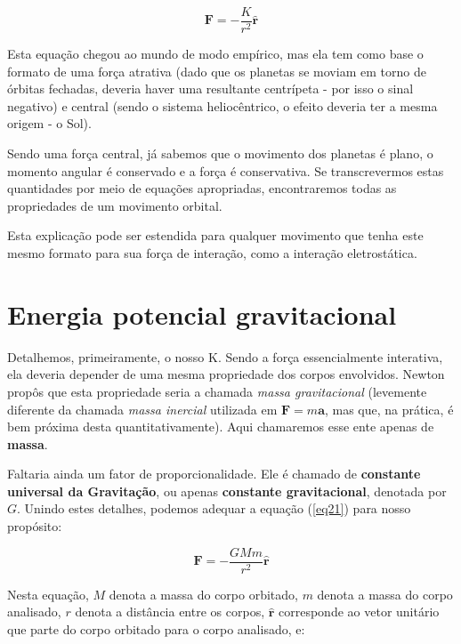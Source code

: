 \begin{equation}
    \mathbf{F} = -\frac{K}{r^2}\mathbf{\hat{r}}    \label{eq24}
\end{equation}

Esta equação chegou ao mundo de modo empírico, mas ela tem como base o formato de uma força atrativa (dado que os planetas se moviam em torno de órbitas fechadas, deveria haver uma resultante centrípeta - por isso o sinal negativo) e central (sendo o sistema heliocêntrico, o efeito deveria ter a mesma origem - o Sol). {\\}

Sendo uma força central, já sabemos que o movimento dos planetas é plano, o momento angular é conservado e a força é conservativa. Se transcrevermos estas quantidades por meio de equações apropriadas, encontraremos todas as propriedades de um movimento orbital. {\\}

Esta explicação pode ser estendida para qualquer movimento que tenha este mesmo formato para sua força de interação, como a interação eletrostática.

\section{Energia potencial gravitacional}

Detalhemos, primeiramente, o nosso K. Sendo a força essencialmente interativa, ela deveria depender de uma mesma propriedade dos corpos envolvidos. Newton propôs que esta propriedade seria a chamada \textit{massa gravitacional} (levemente diferente da chamada \textit{massa inercial} utilizada em $\mathbf{F} = m\mathbf{a}$, mas que, na prática, é bem próxima desta quantitativamente). Aqui chamaremos esse ente apenas de \textbf{massa}. {\\}

Faltaria ainda um fator de proporcionalidade. Ele é chamado de \textbf{constante universal da Gravitação}, ou apenas \textbf{constante gravitacional}, denotada por $G$. Unindo estes detalhes, podemos adequar a equação (\ref{eq21}) para nosso propósito:

\begin{equation}
    \mathbf{F} = -\frac{GMm}{r^2}\mathbf{\hat{r}}    \label{eq25}
\end{equation}

Nesta equação, $M$ denota a massa do corpo orbitado, $m$ denota a massa do corpo analisado, $r$ denota a distância entre os corpos, $\mathbf{\hat{r}}$ corresponde ao vetor unitário que parte do corpo orbitado para o corpo analisado, e:

